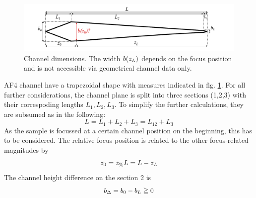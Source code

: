 \begin{figure}[H]  
  \begin{center}
    \includegraphics[width=\linewidth]{./images/fffChannelMeasures.pdf}    
  \end{center}
  \caption[Channel dimensions]{Channel dimensions. The width $b(z_L)$ depends on the focus position and is not 
  accessible via geometrical channel data only.}
  \label{fig:fffChannelMeasures} 
\end{figure}AF4 channel have a trapezoidal shape with measures indicated in fig. \ref{fig:fffChannelMeasures}.
For all further considerations, the channel plane is split into three sections (1,2,3) with their correspoding lengths $L_1, L_2, L_3$. To simplify the further calculations, they are subsumed as in the following:
\begin{equation}
  L
  = L_1 + L_2 + L_3 = L_{12} + L_3   
\end{equation}
As the sample is focussed at a certain channel position on the beginning, this has to be considered. The relative focus position \zP is related to the other focus-related magnitudes by
\begin{equation}
  z_0 = z_\text{\%} L = L - z_L
\end{equation}
The channel height difference \bDelta on the section 2 is
\begin{equation}
  b_\Delta = b_0 - b_L \geqq 0
\end{equation}

